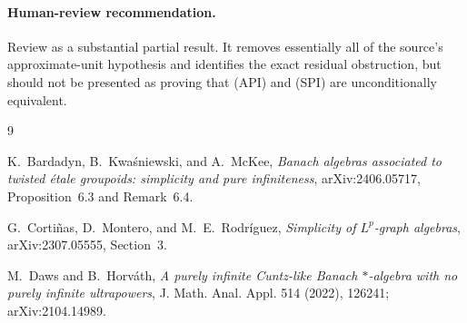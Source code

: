 \documentclass[11pt]{article}
\begin{document}
\paragraph{Human-review recommendation.}
Review as a substantial partial result.  It removes essentially all of the
source's approximate-unit hypothesis and identifies the exact residual
obstruction, but should not be presented as proving that (API) and (SPI) are
unconditionally equivalent.

\begin{thebibliography}{9}

K.~Bardadyn, B.~Kwa\'sniewski, and A.~McKee,
\emph{Banach algebras associated to twisted \'etale groupoids: simplicity and
pure infiniteness}, arXiv:2406.05717, Proposition~6.3 and Remark~6.4.

G.~Corti\~nas, D.~Montero, and M.~E.~Rodr\'iguez,
\emph{Simplicity of $L^p$-graph algebras}, arXiv:2307.05555,
Section~3.

M.~Daws and B.~Horv\'ath,
\emph{A purely infinite Cuntz-like Banach $*$-algebra with no purely infinite
ultrapowers}, J. Math. Anal. Appl. 514 (2022), 126241;
arXiv:2104.14989.

\end{thebibliography}
\end{document}
